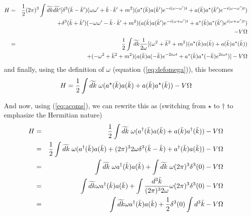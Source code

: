 \documentclass[12pt,epsf]{article}
\def\nolabel{\nonumber }
\def\nolabel{\nonumber }
\begin{document}
\begin{eqnarray}
H &=& {1\over 2}(2\pi)^3 \int \widetilde{dk}\widetilde{dk'}
[\delta^3(\bar k - \bar k')(\omega \omega' + \bar k\cdot \bar k' +
m^2)(a^{\star}(\bar k)a(\bar k ')e^{-i(\omega - \omega')t} + a(\bar
k)a^{\star}(\bar k')e^{-i(\omega - \omega')t}) \nolabel \\
& & \qquad \qquad \quad \;\;\;\; + \delta^3(\bar k + \bar k')(-\omega
\omega' - \bar k \cdot \bar k' + m^2)(a(\bar k)a(\bar k')e^{-i(\omega +
\omega')t} + a^{\star}(\bar k ) a^{\star} (\bar k ') e^{i(\omega +
\omega')t}) \nolabel \\
& & \qquad \qquad \quad \;\;\;\; - V \Omega \nolabel \\
&=& {1\over 2}\int \widetilde{dk}{1\over 2\omega} [ (\omega^2+\bar k^2
+ m^2)(a^{\star}(\bar k)a(\bar k) + a(\bar k ) a^{\star}(\bar k))
\nolabel \\
& & \qquad \qquad + (-\omega^2 + \bar k^2 + m^2)(a(\bar k)a(-\bar
k)e^{-2i\omega t} + a^{\star}(\bar k) a^{\star}(-\bar k)e^{2i\omega
t})] - V\Omega\nolabel
\end{eqnarray}
and finally, using the definition of $\omega$ (equation
(\ref{eq:defomega})), this becomes 
\begin{eqnarray}
H = {1\over 2} \int \widetilde{dk}\; \omega (a^{\star}(\bar k)a(\bar k)
+ a(\bar k)a^{\star} (\bar k)) - V\Omega\nolabel
\end{eqnarray}

And now, using (\ref{eq:acoms}), we can rewrite this as (switching from
$\star$ to $\dagger$ to emphasize the Hermitian nature)
\begin{eqnarray}
H &=& {1\over 2}\int \widetilde{dk}\; \omega (a^{\dagger}(\bar k
)a(\bar k) + a(\bar k) a^{\dagger}(\bar k)) - V \Omega \nolabel \\
&=& {1\over 2}\int \widetilde{dk} \; \omega (a^{\dagger}(\bar k )a(\bar
k) + (2\pi)^3 2\omega \delta^3(\bar k - \bar k ) + a^{\dagger}(\bar k )
a(\bar k )) - V \Omega \nolabel \\
&=& \int \widetilde{dk} \; \omega a^{\dagger}(\bar k ) a (\bar k ) +
\int \widetilde{dk} \; \omega (2\pi)^3 \delta^3(0) - V\Omega \nolabel
\\
&=& \int \widetilde{dk} \omega a^{\dagger}(\bar k )a(\bar k ) + \int
{d^3 \bar k \over (2\pi)^3 2\omega} \omega (2\pi)^3 \delta^3(0) -
V\Omega \nolabel \\
&=& \int \widetilde{dk} \omega a^{\dagger}(\bar k )a(\bar k ) + {1\over
2} \delta^3(0) \int d^3\bar k - V\Omega \nolabel
\end{eqnarray}
\end{document}

